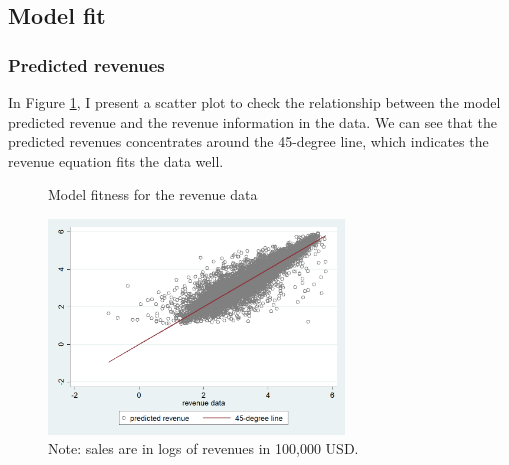 \documentclass[11pt]{article}
\begin{document}
\subsection{Model fit} \label{app_model_fit}
\subsubsection{Predicted revenues} In Figure \ref{F3}, I present a scatter plot to check the relationship between the model predicted revenue and the revenue information in the data. We can see that the predicted revenues concentrates around the 45-degree line, which indicates the revenue equation fits the data well. 

\begin{center}
\begin{figure}[h]
\caption{Model fitness for the revenue data}
\label{F3}
\begin{centering}
\includegraphics[width=0.7\textwidth]{Figs/revenue.png}
\par\end{centering}
\caption*{\small{}Note: sales are in logs of revenues in 100,000 USD.}{\small \par}
\end{figure}
\par\end{center}
\end{document}
